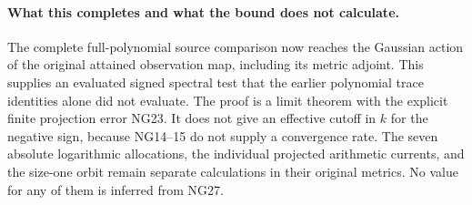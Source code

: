 \documentclass[11pt]{article}
\begin{document}
\paragraph{What this completes and what the bound does not calculate.}
The complete full-polynomial source comparison now reaches the Gaussian
action of the original attained observation map, including its metric
adjoint. This supplies an evaluated signed spectral test that the earlier
polynomial trace identities alone did not evaluate. The proof is a limit
theorem with the explicit finite projection error NG23. It does not give
an effective cutoff in $k$ for the negative sign, because NG14--15 do not
supply a convergence rate. The seven absolute logarithmic allocations,
the individual projected arithmetic currents, and the size-one orbit
remain separate calculations in their original metrics. No value for
any of them is inferred from NG27.
\end{document}
